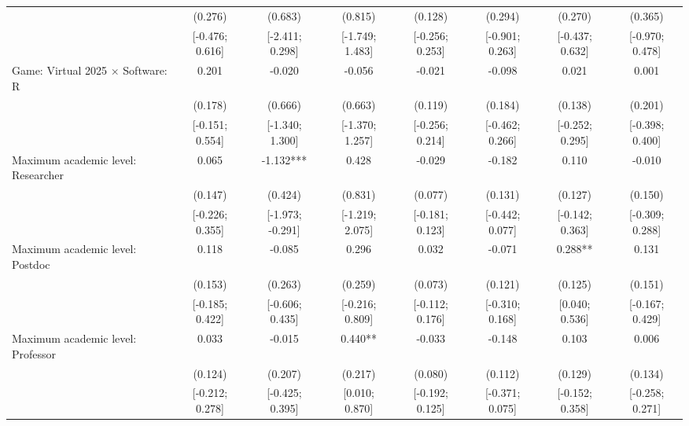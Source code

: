 \begin{tabular}{l*{7}{c}}
                    &     (0.276)   &     (0.683)   &     (0.815)   &     (0.128)   &     (0.294)   &     (0.270)   &     (0.365)   \\
                    &[-0.476; 0.616]   &[-2.411; 0.298]   &[-1.749; 1.483]   &[-0.256; 0.253]   &[-0.901; 0.263]   &[-0.437; 0.632]   &[-0.970; 0.478]   \\
Game: Virtual 2025 $\times$ Software: R&       0.201   &      -0.020   &      -0.056   &      -0.021   &      -0.098   &       0.021   &       0.001   \\
                    &     (0.178)   &     (0.666)   &     (0.663)   &     (0.119)   &     (0.184)   &     (0.138)   &     (0.201)   \\
                    &[-0.151; 0.554]   &[-1.340; 1.300]   &[-1.370; 1.257]   &[-0.256; 0.214]   &[-0.462; 0.266]   &[-0.252; 0.295]   &[-0.398; 0.400]   \\
Maximum academic level: Researcher&       0.065   &      -1.132***&       0.428   &      -0.029   &      -0.182   &       0.110   &      -0.010   \\
                    &     (0.147)   &     (0.424)   &     (0.831)   &     (0.077)   &     (0.131)   &     (0.127)   &     (0.150)   \\
                    &[-0.226; 0.355]   &[-1.973; -0.291]   &[-1.219; 2.075]   &[-0.181; 0.123]   &[-0.442; 0.077]   &[-0.142; 0.363]   &[-0.309; 0.288]   \\
Maximum academic level: Postdoc&       0.118   &      -0.085   &       0.296   &       0.032   &      -0.071   &       0.288** &       0.131   \\
                    &     (0.153)   &     (0.263)   &     (0.259)   &     (0.073)   &     (0.121)   &     (0.125)   &     (0.151)   \\
                    &[-0.185; 0.422]   &[-0.606; 0.435]   &[-0.216; 0.809]   &[-0.112; 0.176]   &[-0.310; 0.168]   &[0.040; 0.536]   &[-0.167; 0.429]   \\
Maximum academic level: Professor&       0.033   &      -0.015   &       0.440** &      -0.033   &      -0.148   &       0.103   &       0.006   \\
                    &     (0.124)   &     (0.207)   &     (0.217)   &     (0.080)   &     (0.112)   &     (0.129)   &     (0.134)   \\
                    &[-0.212; 0.278]   &[-0.425; 0.395]   &[0.010; 0.870]   &[-0.192; 0.125]   &[-0.371; 0.075]   &[-0.152; 0.358]   &[-0.258; 0.271]   \\

\end{tabular}
